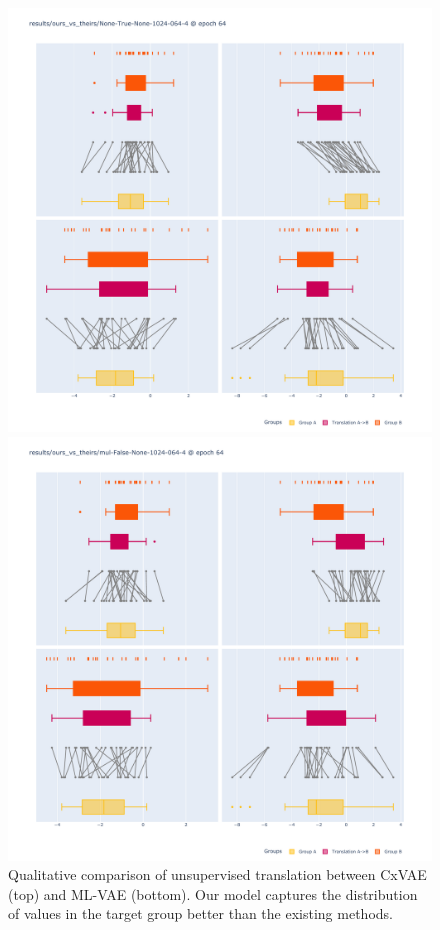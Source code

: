 \documentclass[nohyperref]{article}
\theoremstyle{plain}
\theoremstyle{definition}
\theoremstyle{remark}
\begin{document}
\begin{figure}[ht]
    \vskip 0.2in
    \begin{center}
    \centerline{\includegraphics[width=\columnwidth]{files/ours.pdf}}
    \centerline{\includegraphics[width=\columnwidth]{files/theirs.pdf}}
    \caption{Qualitative comparison of unsupervised translation between CxVAE (top) and ML-VAE \citep{Bouchacourt2018MultiLevelVA} (bottom). Our model captures the distribution of values in the target group better than the existing methods.}
    \label{qualitative}
    \end{center}
    \vskip -0.2in
\end{figure}
\end{document}
